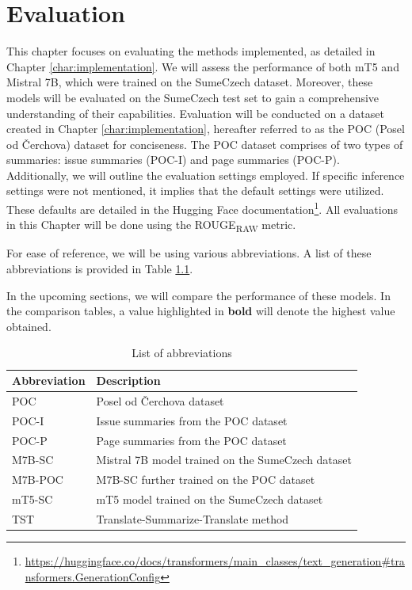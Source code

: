 \documentclass[english, ba, kiv, he, iso690numb, pdf, viewonly]{fasthesis}
\begin{document}
\chapter{Evaluation}\label{ch:eval}
This chapter focuses on evaluating the methods implemented, as detailed in Chapter \ref{char:implementation}. We will assess the performance of both mT5 and Mistral 7B, which were trained on the SumeCzech dataset. Moreover, these models will be evaluated on the SumeCzech test set to gain a comprehensive understanding of their capabilities. Evaluation will be conducted on a dataset created in Chapter \ref{char:implementation}, hereafter referred to as the POC (Posel od Čerchova) dataset for conciseness. The POC dataset comprises of two types of summaries: issue summaries (POC-I) and page summaries (POC-P). Additionally, we will outline the evaluation settings employed. If specific inference settings were not mentioned, it implies that the default settings were utilized. These defaults are detailed in the Hugging Face documentation\footnote{\url{https://huggingface.co/docs/transformers/main_classes/text_generation\#transformers.GenerationConfig}}. All evaluations in this Chapter will be done using the ROUGE\textsubscript{RAW} metric.

For ease of reference, we will be using various abbreviations. A list of these abbreviations is provided in Table \ref{tab:abbreviations}.

In the upcoming sections, we will compare the performance of these models. In the comparison tables, a value highlighted in \textbf{bold} will denote the highest value obtained.

\begin{table}[ht]
    \centering
    \caption{List of abbreviations}
    \label{tab:abbreviations}
        \begin{tabular}{ll}
        \hline
        \textbf{Abbreviation} & \textbf{Description}                                             \\ \hline
        POC                   & Posel od Čerchova dataset                                        \\
        POC-I                 & Issue summaries from the POC dataset                             \\
        POC-P                 & Page summaries from the POC dataset                              \\
        M7B-SC                & Mistral 7B model trained on the SumeCzech dataset                 \\
        M7B-POC               & M7B-SC further trained on the POC dataset               \\
        mT5-SC                & mT5 model trained on the SumeCzech dataset                        \\
        TST                   & Translate-Summarize-Translate method                           \\ \hline
    \end{tabular}
\end{table}
 
\end{document}
